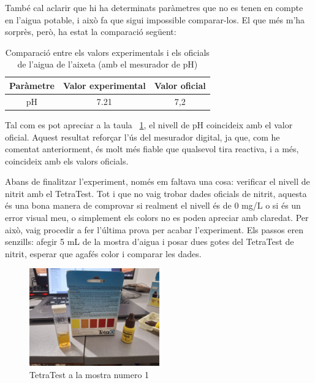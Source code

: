 També cal aclarir que hi ha determinats paràmetres que no es tenen en compte en l’aigua potable, i això fa que sigui impossible comparar-los. El que més m’ha sorprès, però, ha estat la comparació següent:

\begin{minipage}[h]{1\textwidth}
  \begin{table}[H]
  \centering
  \begin{tabular}{|c|c|c|}
  \hline
  \textbf{Paràmetre} & \textbf{Valor experimental} & \textbf{Valor oficial} \\
  \hline \hline
  pH & 7.21 & 7,2 \\
  \hline
  \end{tabular}
  \caption{Comparació entre els valors experimentals i els oficials de l'aigua de l'aixeta (amb el mesurador de pH)}
  \label{tab:comparacio_mesurador_ph1}
\end{table}
\end{minipage}

\bigskip

Tal com es pot apreciar a la taula~ \ref{tab:comparacio_mesurador_ph1}, el nivell de pH coincideix amb el valor oficial. Aquest resultat reforçar l'ús del mesurador digital, ja que, com he comentat anteriorment, és molt més fiable que qualsevol tira reactiva, i a més, coincideix amb els valors oficials.

Abans de finalitzar l’experiment, només em faltava una cosa: verificar el nivell de nitrit amb el TetraTest. Tot i que no vaig trobar dades oficials de nitrit, aquesta és una bona manera de comprovar si realment el nivell és de 0 mg/L o si és un error visual meu, o simplement els colors no es poden apreciar amb claredat. Per això, vaig procedir a fer l’última prova per acabar l’experiment. Els passos eren senzills: afegir 5 mL de la mostra d’aigua i posar dues gotes del TetraTest de nitrit, esperar que agafés color i comparar les dades.

\begin{figure}[H]
\centering
\includegraphics[width=0.5\textwidth]{./Figures/Tetra1.png}
\caption{TetraTest a la mostra numero 1}
\label{fig:TetraTestdeNitrit1}
\end{figure}

